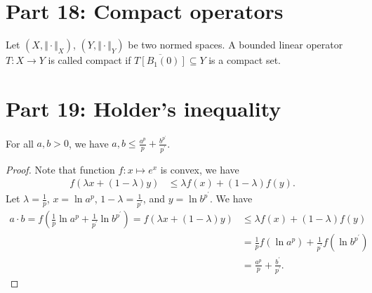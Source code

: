 \documentclass[../../note.tex]{subfiles}
\begin{document}
\section{Part 18: Compact operators}
\begin{definition}
    Let $(X, \Vert \cdot \Vert_X)$, $(Y, \Vert \cdot \Vert_Y)$ be two normed spaces. A bounded linear operator $T: X \rightarrow Y$ is called compact if $\overline{T[B_1(0)]} \subseteq Y$ is a compact set.
\end{definition}

\section{Part 19: Holder's inequality}
\begin{lemma}
    \label{lemma: Young's inequality}
    For all $a,b > 0 $, we have $a,b\leq \frac{a^p}{p} + \frac{b^{p^\prime}}{p^\prime}$.
\end{lemma}
\begin{proof}
    Note that function $f: x \mapsto e^x$ is convex, we have
    \begin{align}
        f(\lambda x + (1-\lambda) y )
        &\leq \lambda f(x) + (1-\lambda) f(y).
    \end{align}
    Let $\lambda = \frac{1}{p}$, $x = \ln a^p $, $1-\lambda = \frac{1}{p^\prime}$, and $y = \ln b^{p^\prime}$. We have
    \begin{align}
        a \cdot b = f(\frac{1}{p}  \ln a^p + \frac{1}{p^\prime} \ln b^{p^\prime} ) = f(\lambda x + (1-\lambda) y )
        &\leq \lambda f(x) + (1-\lambda) f(y) \\
        &=\frac{1}{p} f(\ln a^p) + \frac{1}{p^\prime} f(\ln b^{p^\prime}) \\
        &= \frac{a^p}{p} + \frac{b^\prime}{p^\prime}.
    \end{align}
\end{proof}
\end{document}
